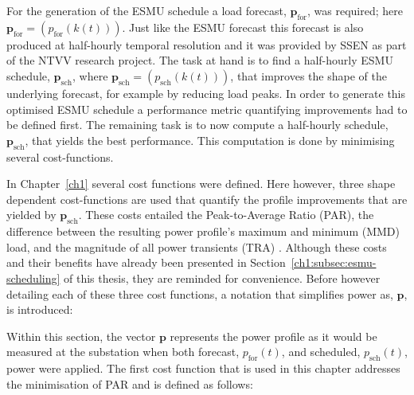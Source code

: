 For the generation of the ESMU schedule a load forecast, $\textbf{p}_\text{for}$, was required; here $\textbf{p}_\text{for} = (p_\text{for}(k(t)))$.
Just like the ESMU forecast this forecast is also produced at half-hourly temporal resolution and it was provided by SSEN as part of the NTVV research project.
The task at hand is to find a half-hourly ESMU schedule, $\textbf{p}_\text{sch}$, where $\textbf{p}_\text{sch} = (p_\text{sch}(k(t)))$, that improves the shape of the underlying forecast, for example by reducing load peaks.
In order to generate this optimised ESMU schedule a performance metric quantifying improvements had to be defined first.
The remaining task is to now compute a half-hourly schedule, $\textbf{p}_\text{sch}$, that yields the best performance.
This computation is done by minimising several cost-functions.

In Chapter~\ref{ch1} several cost functions were defined.
Here however, three shape dependent cost-functions are used that quantify the profile improvements that are yielded by $\textbf{p}_\text{sch}$.
These costs entailed the Peak-to-Average Ratio (PAR), the difference between the resulting power profile's maximum and minimum (MMD) load, and the magnitude of all power transients (TRA) \cite{Mohsenian-Rad2010, Mostafa2016}.
Although these costs and their benefits have already been presented in Section~\ref{ch1:subsec:esmu-scheduling} of this thesis, they are reminded for convenience.
Before however detailing each of these three cost functions, a notation that simplifies power as, $\textbf{p}$, is introduced:



Within this section, the vector $\textbf{p}$ represents the power profile as it would be measured at the substation when both forecast, $p_\text{for}(t)$, and scheduled, $p_\text{sch}(t)$, power were applied.
The first cost function that is used in this chapter addresses the minimisation of PAR and is defined as follows:






